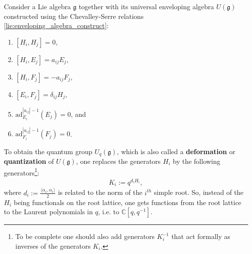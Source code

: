     \begin{construct}
        Consider a Lie algebra $\mathfrak{g}$ together with its universal enveloping algebra $U(\mathfrak{g})$ constructed using the Chevalley-Serre relations \ref{lie:enveloping_algebra_construct}:
        \begin{enumerate}
            \item $[H_i,H_j] = 0$,
            \item $[H_i,E_j] = a_{ij}E_j$,
            \item $[H_i,F_j] = -a_{ij}F_j$,
            \item $[E_i,F_j] = \delta_{ij}H_j$,
            \item $\text{ad}_{E_i}^{|a_{ij}|-1}(E_j) = 0$, and
            \item $\text{ad}_{F_i}^{|a_{ij}|-1}(F_j) = 0$.
        \end{enumerate}
         To obtain the quantum group $U_q(\mathfrak{g})$, which is also called a \textbf{deformation} or \textbf{quantization} of $U(\mathfrak{g})$, one replaces the generators $H_i$ by the following generators\footnote{To be complete one should also add generators $K_i^{-1}$ that act formally as inverses of the generators $K_i$.}:
        \begin{gather}
            K_i := q^{d_iH_i},
        \end{gather}
        where $d_i := \frac{\langle\alpha_i,\alpha_i\rangle}{2}$ is related to the norm of the $i^{th}$ simple root. So, instead of the $H_i$ being functionals on the root lattice, one gets functions from the root lattice to the Laurent polynomials in $q$, i.e. to $\mathbb{C}[q,q^{-1}]$.


\end{construct}
